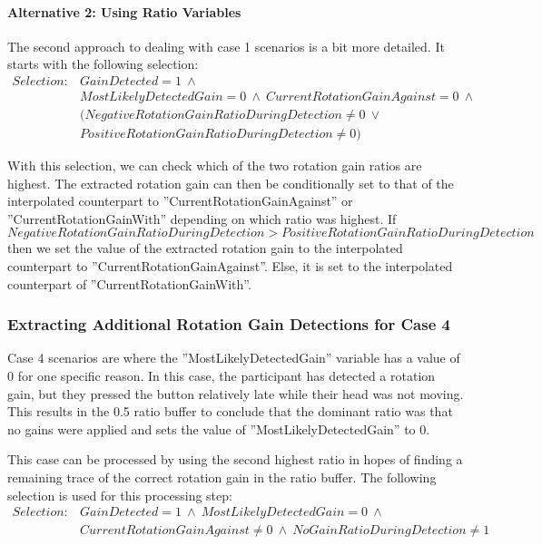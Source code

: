 \paragraph{Alternative 2: Using Ratio Variables} 
The second approach to dealing with case 1 scenarios is a bit more detailed. It starts with the following selection: 
\begin{align*}
Selection: & GainDetected = 1 \ \land \nonumber \\ & MostLikelyDetectedGain = 0 \ \land \ CurrentRotationGainAgainst = 0 \ \land \nonumber \\ & (NegativeRotationGainRatioDuringDetection \neq 0 \ \lor \nonumber \\ & PositiveRotationGainRatioDuringDetection \neq 0) \nonumber
\end{align*}

With this selection, we can check which of the two rotation gain ratios are highest. The extracted rotation gain can then be conditionally set to that of the interpolated counterpart to ''CurrentRotationGainAgainst'' or ''CurrentRotationGainWith'' depending on which ratio was highest. If $NegativeRotationGainRatioDuringDetection > PositiveRotationGainRatioDuringDetection$ then we set the value of the extracted rotation gain to the interpolated counterpart to ''CurrentRotationGainAgainst''. Else, it is set to the interpolated counterpart of ''CurrentRotationGainWith''.
     
\subsubsection{Extracting Additional Rotation Gain Detections for Case 4}
Case 4 scenarios are where the ''MostLikelyDetectedGain'' variable has a value of 0 for one specific reason. In this case, the participant has detected a rotation gain, but they pressed the button relatively late while their head was not moving. This results in the 0.5 ratio buffer to conclude that the dominant ratio was that no gains were applied and sets the value of ''MostLikelyDetectedGain'' to 0. 

This case can be processed by using the second highest ratio in hopes of finding a remaining trace of the correct rotation gain in the ratio buffer. The following selection is used for this processing step:
\begin{align*}
Selection: & Gain Detected = 1 \ \land \ MostLikelyDetectedGain = 0 \ \land \nonumber \\ & CurrentRotationGainAgainst \neq 0 \ \land \ NoGainRatioDuringDetection \neq 1 \nonumber
\end{align*}

